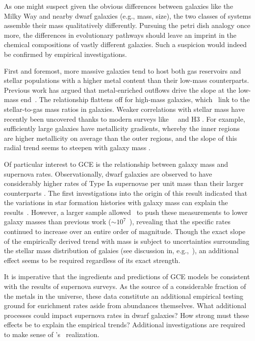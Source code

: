 \documentclass[main.tex]{subfiles}
\begin{document}
\begin{doublespace}
As one might suspect given the obvious differences between galaxies like the
Milky Way and nearby dwarf galaxies (e.g., mass, size), the two classes of
systems assemble their mass qualitatively differently.
Pursuing the petri dish analogy once more, the differences in evolutionary
pathways should leave an imprint in the chemical compositions of vastly
different galaxies.
Such a suspicion would indeed be confirmed by empirical investigations.
\par
First and foremost, more massive galaxies tend to host both gas reservoirs
\citep{Tremonti2004, Zahid2011, Zahid2012, Andrews2013} and stellar populations
\citep{Gallazzi2005, Kirby2013} with a higher metal content than their low-mass
counterparts.
Previous work has argued that metal-enriched outflows drive the slope at the
low-mass end~\citep{Finlator2008, Peeples2011, Chisholm2018}.
The relationship flattens off for high-mass galaxies, which~\citet{Zahid2014}
link to the stellar-to-gas mass ratios in galaxies.
Weaker correlations with stellar mass have recently been uncovered thanks to
modern surveys like~\gaia~\citep{GaiaCollaboration2016} and H3
\citep{Conroy2019}.
For example, sufficiently large galaxies have metallicity gradients, whereby
the inner regions are higher metallicity on average than the outer regions,
and the slope of this radial trend seems to steepen with galaxy mass
\citep[e.g.,][]{Goddard2017}.
\par
Of particular interest to GCE is the relationship between galaxy mass and
supernova rates.
Observationally, dwarf galaxies are observed to have considerably higher rates
of Type Ia supernovae per unit mass than their larger counterparts
\citep[e.g.,][]{Leaman2011, Li2011}.
The first investigations into the origin of this result indicated that the
variations in star formation histories with galaxy mass can explain the
results~\citep[e.g.,][]{Graur2013, Graur2015}.
However, a larger sample allowed~\citet{Brown2019} to push these measurements
to lower galaxy masses than previous work ($\sim$$10^7$~\msun), revealing that
the specific rates continued to increase over an entire order of magnitude.
Though the exact slope of the empirically derived trend with mass is subject to
uncertainties surrounding the stellar mass distribution of galaies (see
discussion in, e.g.,~\citealt{Gandhi2022}), an additional effect seems to be
required regardless of its exact strength.
\par
It is imperative that the ingredients and predictions of GCE models be
consistent with the results of supernova surveys.
As the source of a considerable fraction of the metals in the universe, these
data constitute an additional empirical testing ground for enrichment rates
aside from abundances themselves.
What additional processes could impact supernova rates in dwarf galaxies?
How strong must these effects be to explain the empirical trends?
Additional investigations are required to make sense of
\citet{Brown2019}'s~\citeyearpar{Brown2019} realization.


\end{doublespace}
\end{document}
